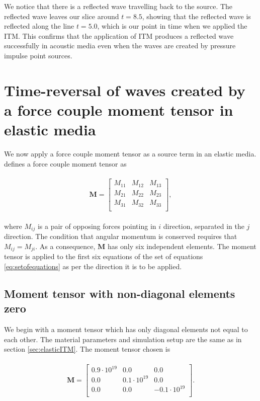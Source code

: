 We notice that there is a reflected wave travelling back to the source. The reflected wave leaves our slice around $t=8.5$, showing that the reflected wave is reflected
along the line $t=5.0$, which is our point in time when we applied the \ac{ITM}. This confirms that the application of \ac{ITM} produces a reflected wave successfully in acoustic media even
when the waves are created by pressure impulse point sources.

\section{Time-reversal of waves created by a force couple moment tensor in elastic media}
We now apply a force couple moment tensor as a source term in an elastic media.\parencite[Sec. 9.2]{shearer_2019} defines a force couple moment tensor as

\begin{align}
    \begin{split}
        \mathbf{M} =
            \begin{bmatrix}
                M_{11} & M_{12} & M_{13} \\
                M_{21} & M_{22} & M_{23} \\
                M_{31} & M_{32} & M_{33} \\
            \end{bmatrix} ,
    \end{split}
\end{align}

where $M_{ij}$ is a pair of opposing forces pointing in $i$ direction, separated in the $j$ direction. The condition that angular momentum is conserved requires that $M_{ij} = M_{ji}$. As a consequence, $\mathbf{M}$ has only six independent elements. The moment tensor is applied to the first six equations of the set of equations \ref{eq:setofequations} as per the direction it is to be applied.

\subsection{Moment tensor with non-diagonal elements zero}
We begin with a moment tensor which has only diagonal elements not equal to each other. The material parameters and simulation setup are the same as in section \ref{sec:elasticITM}. The moment tensor chosen is

\begin{align}
    \begin{split}
        \mathbf{M} =
            \begin{bmatrix}
                0.9 \cdot10^{19} & 0.0 &0.0 \\
                0.0 & 0.1 \cdot 10^{19} & 0.0 \\
                0.0 & 0.0 & -0.1 \cdot 10^{19} \\
            \end{bmatrix} .
    \end{split}
\end{align}

